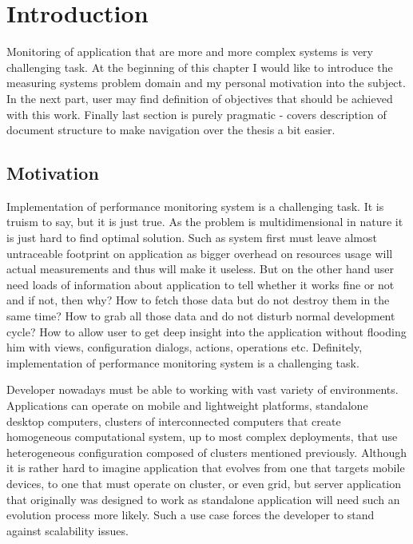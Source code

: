 %
\chapter{Introduction}
\label{cha:intro}


\parbox{0.8\textwidth}{

{\small
Monitoring of application that are more and more complex systems is very challenging task. At the beginning of this chapter I would like to introduce the measuring systems problem domain and my personal motivation into the subject. In the next part, user may find definition of objectives that should be achieved with this work. Finally last section is purely pragmatic - covers description of document structure to make navigation over the thesis a bit easier.
}
}

\section{Motivation}
\label{ch1:Motivation}

Implementation of performance monitoring system is a challenging task. It is truism to say, but it is just true. As the problem is multidimensional in nature it is just hard to find optimal solution. Such as system first must leave almost untraceable footprint on application as bigger overhead on resources usage will actual measurements and thus will make it useless. But on the other hand user need loads of information about application to tell whether it works fine or not and if not, then why? How to fetch those data but do not destroy them in the same time? How to grab all those data and do not disturb normal development cycle? How to allow user to get deep insight into the application without flooding him with views, configuration dialogs, actions, operations etc. Definitely, implementation of performance monitoring system is a challenging task.

Developer nowadays must be able to working with vast variety of environments. Applications can operate on mobile and lightweight platforms, standalone desktop computers, clusters of interconnected computers that create homogeneous computational system, up to most complex deployments, that use heterogeneous configuration composed of clusters mentioned previously. Although it is rather hard to imagine application that evolves from one that targets mobile devices, to one that must operate on cluster, or even grid, but server application that originally was designed to work as standalone application will need such an evolution process more likely. Such a use case forces the developer to stand against scalability issues.

